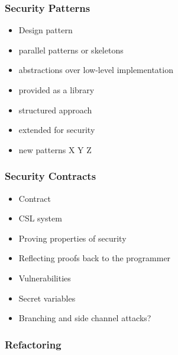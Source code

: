 \documentclass[a4paper,11pt]{article}
\begin{document}
\subsubsection{Security Patterns}


\begin{itemize}
	\item Design pattern
	\item parallel patterns or skeletons
	\item abstractions over low-level implementation
	\item provided as a library
	\item structured approach
	\item extended for security
	\item new patterns X Y Z
\end{itemize}

\subsubsection{Security Contracts}


\begin{itemize}
    \item Contract
    \item CSL system
    \item Proving properties of security
    \item Reflecting proofs back to the programmer
    \item Vulnerabilities
    \item Secret variables
    \item Branching and side channel attacks?
\end{itemize}

\subsubsection{Refactoring}
\end{document}
